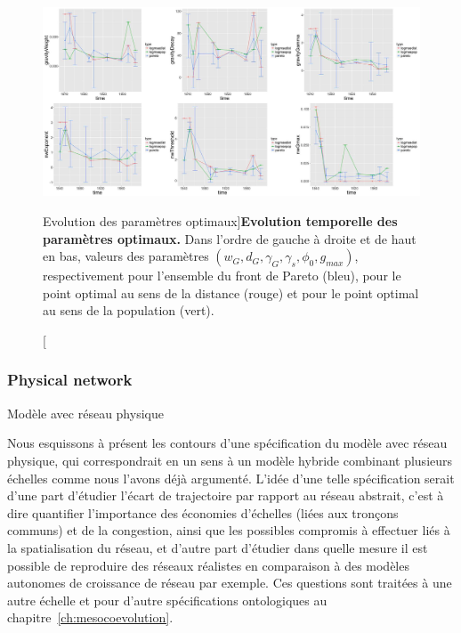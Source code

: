 \begin{figure}
	\includegraphics[width=\linewidth]{Figures/Final/6-2-3-fig-macrocoevol-parameters.jpg}
	\caption[Evolution of optimal parameters][Evolution des paramètres optimaux]{\label{fig:macrocoevol:parameters}}{\textbf{Evolution temporelle des paramètres optimaux.} Dans l'ordre de gauche à droite et de haut en bas, valeurs des paramètres $(w_G,d_G,\gamma_G,\gamma_s,\phi_0,g_{max})$, respectivement pour l'ensemble du front de Pareto (bleu), pour le point optimal au sens de la distance (rouge) et pour le point optimal au sens de la population (vert).\comment[FL]{()}\label{fig:macrocoevol:parameters}}
\end{figure}








\subsubsection{Physical network}{Modèle avec réseau physique}


Nous esquissons à présent les contours d'une spécification du modèle avec réseau physique, qui correspondrait en un sens à un modèle hybride combinant plusieurs échelles comme nous l'avons déjà argumenté. L'idée d'une telle spécification serait d'une part d'étudier l'écart de trajectoire par rapport au réseau abstrait, c'est à dire quantifier l'importance des économies d'échelles (liées aux tronçons communs) et de la congestion, ainsi que les possibles compromis à effectuer liés à la spatialisation du réseau, et d'autre part d'étudier dans quelle mesure il est possible de reproduire des réseaux réalistes en comparaison à des modèles autonomes de croissance de réseau par exemple. Ces questions sont traitées à une autre échelle et pour d'autre spécifications ontologiques au chapitre~\ref{ch:mesocoevolution}. 


